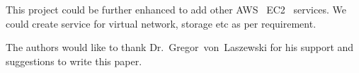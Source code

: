 This project could be further enhanced to add other
AWS~\cite{hid-sp18-511-www-aws} EC2~\cite{hid-sp18-511-www-ec2}
services. We could create service for virtual network, storage etc as
per requirement.

\begin{acks}

  The authors would like to thank Dr.~Gregor~von~Laszewski for his
  support and suggestions to write this paper.

\end{acks}


 

%
%
%
%
